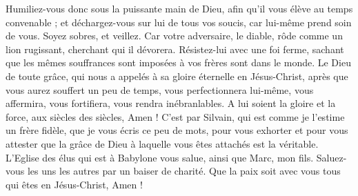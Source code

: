 \begin{multicols}{2}
Humiliez-vous donc sous la puissante main de Dieu, afin qu'il vous élève au temps convenable ;
et déchargez-vous sur lui de tous vos soucis, car lui-même prend soin de vous.
Soyez sobres, et veillez. Car votre adversaire, le diable, rôde comme un lion rugissant, cherchant qui il dévorera.
Résistez-lui avec une foi ferme, sachant que les mêmes souffrances sont imposées à vos frères sont dans le monde.
\TextTitle{[Conclusion]}
Le Dieu de toute grâce, qui nous a appelés à sa gloire éternelle en Jésus-Christ, après que vous aurez souffert un peu de temps, vous perfectionnera lui-même, vous affermira, vous fortifiera, vous rendra inébranlables.
A lui soient la gloire et la force, aux siècles des siècles, Amen !
C’est par Silvain, qui est comme je l’estime un frère fidèle, que je vous écris ce peu de mots, pour vous exhorter et pour vous attester que la grâce de Dieu à laquelle vous êtes attachés est la véritable.
L’Eglise des élus qui est à Babylone vous salue, ainsi que Marc, mon fils.
Saluez-vous les uns les autres par un baiser de charité. Que la paix soit avec vous tous qui êtes en Jésus-Christ, Amen !
\PPE{}
\end{multicols}
